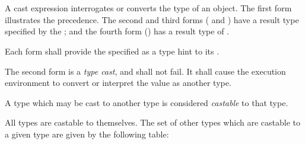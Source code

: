 
\begin{grammar}
 \\
	 \\
	 \terminal{:}  \\
	   \\
	   \\

 \\
	 \\
\end{grammar}

\specsubsubitem
A cast expression interrogates or converts the type of an object. The first
form illustrates the precedence. The second and third forms (\terminal{:} and
) have a result type specified by the ; and the
fourth form () has a result type of .

\specsubsubitem
Each form shall provide the specified  as a type hint to its
.

\specsubsubitem
The second form is a \textit{type cast}, and shall not fail. It shall cause the
execution environment to convert or interpret the value as another type.

\specsubsubitem
A type which may be cast to another type is considered \textit{castable} to
that type.

\specsubsubitem
All types are castable to themselves. The set of other types which are castable
to a given type are given by the following table:

